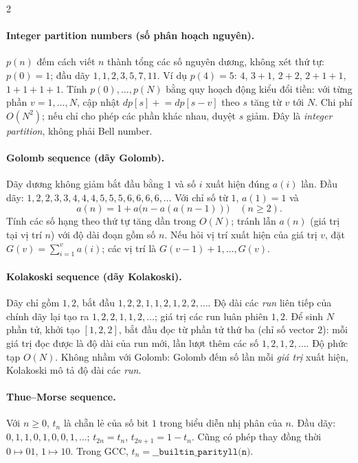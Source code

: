 \begin{multicols}{2}
\paragraph{Integer partition numbers (số phân hoạch nguyên).}
$p(n)$ đếm cách viết $n$ thành tổng các số nguyên dương,
không xét thứ tự: $p(0)=1$; đầu dãy $1,1,2,3,5,7,11$.
Ví dụ $p(4)=5$: $4$, $3+1$, $2+2$, $2+1+1$, $1+1+1+1$.
Tính $p(0),\ldots,p(N)$ bằng quy hoạch động kiểu đổi tiền:
với từng phần $v=1,\ldots,N$, cập nhật
$dp[s]\mathrel{+}=dp[s-v]$ theo $s$ tăng từ $v$ tới $N$.
Chi phí $O(N^2)$; nếu chỉ cho phép các phần khác nhau, duyệt $s$
giảm. Đây là \emph{integer partition}, không phải Bell number.

\paragraph{Golomb sequence (dãy Golomb).}
Dãy dương không giảm bắt đầu bằng $1$ và số $i$ xuất hiện
đúng $a(i)$ lần. Đầu dãy:
$1,2,2,3,3,4,4,4,5,5,5,6,6,6,6,\ldots$
Với chỉ số từ $1$, $a(1)=1$ và
\[
a(n)=1+a\bigl(n-a(a(n-1))\bigr)\quad(n\ge2).
\]
Tính các số hạng theo thứ tự tăng dần trong $O(N)$; tránh
lẫn $a(n)$ (giá trị tại vị trí $n$) với độ dài đoạn gồm số $n$.
Nếu hỏi vị trí xuất hiện của giá trị $v$, đặt
$G(v)=\sum_{i=1}^{v}a(i)$; các vị trí là
$G(v-1)+1,\ldots,G(v)$.

\paragraph{Kolakoski sequence (dãy Kolakoski).}
Dãy chỉ gồm $1,2$, bắt đầu $1,2,2,1,1,2,1,2,2,\ldots$.
Độ dài các \emph{run} liên tiếp của chính dãy lại tạo ra
$1,2,2,1,1,2,\ldots$; giá trị các run luân phiên $1,2$.
Để sinh $N$ phần tử, khởi tạo $[1,2,2]$, bắt đầu đọc từ
phần tử thứ ba (chỉ số vector $2$): mỗi giá trị đọc được là
độ dài của run mới, lần lượt thêm các số $1,2,1,2,\ldots$.
Độ phức tạp $O(N)$. Không nhầm với Golomb: Golomb đếm số lần
mỗi \emph{giá trị} xuất hiện, Kolakoski mô tả độ dài các \emph{run}.

\paragraph{Thue--Morse sequence.}
Với $n\ge0$, $t_n$ là chẵn lẻ của số bit $1$ trong biểu diễn nhị phân
của $n$. Đầu dãy: $0,1,1,0,1,0,0,1,\ldots$;
$t_{2n}=t_n$, $t_{2n+1}=1-t_n$.
Cũng có phép thay đồng thời $0\mapsto01$, $1\mapsto10$.
Trong GCC, $t_n=\texttt{\_\_builtin\_parityll(n)}$.


\end{multicols}

